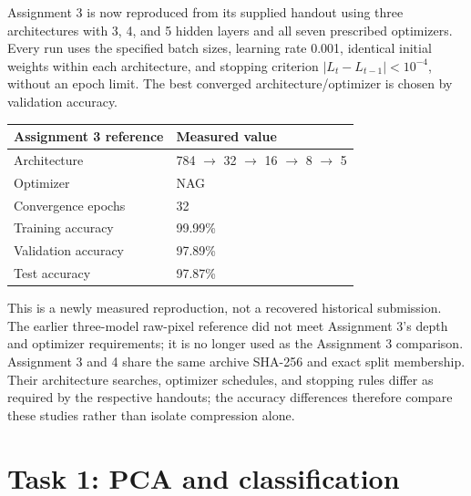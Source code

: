 \documentclass[11pt,a4paper]{article}
\begin{document}
Assignment 3 is now reproduced from its supplied handout using three architectures with 3, 4, and 5 hidden layers and all seven prescribed optimizers. Every run uses the specified batch sizes, learning rate 0.001, identical initial weights within each architecture, and stopping criterion $|L_t-L_{t-1}|<10^{-4}$, without an epoch limit. The best converged architecture/optimizer is chosen by validation accuracy.


\begingroup\small\setlength{\tabcolsep}{5pt}

\begin{tabularx}{\linewidth}{lY}

\toprule

\textbf{Assignment 3 reference} & \textbf{Measured value} \\

\midrule

Architecture & 784 $\to$ 32 $\to$ 16 $\to$ 8 $\to$ 5 \\

Optimizer & NAG \\

Convergence epochs & 32 \\

Training accuracy & 99.99\% \\

Validation accuracy & 97.89\% \\

Test accuracy & 97.87\% \\

\bottomrule\end{tabularx}\endgroup\par\medskip

This is a newly measured reproduction, not a recovered historical submission. The earlier three-model raw-pixel reference did not meet Assignment 3's depth and optimizer requirements; it is no longer used as the Assignment 3 comparison. Assignment 3 and 4 share the same archive SHA-256 and exact split membership. Their architecture searches, optimizer schedules, and stopping rules differ as required by the respective handouts; the accuracy differences therefore compare these studies rather than isolate compression alone.


\clearpage

\section{Task 1: PCA and classification}
\end{document}
